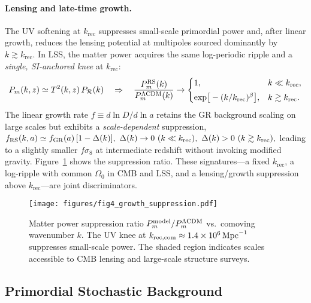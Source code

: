 \documentclass[11pt]{article}
\theoremstyle{definition}
\theoremstyle{remark}
\begin{document}
\paragraph{Lensing and late-time growth.}
The UV softening at \(k_{\mathrm{rec}}\) suppresses small-scale primordial power and, after linear growth, reduces the lensing potential at multipoles sourced dominantly by \(k\gtrsim k_{\mathrm{rec}}\). In LSS, the matter power acquires the same log-periodic ripple and a \emph{single, SI-anchored knee} at \(k_{\mathrm{rec}}\):
\begin{equation}
P_m(k,z)\simeq T^2(k,z)\,P_{\mathcal R}(k)\quad\Rightarrow\quad
\frac{P_m^{\rm RS}(k)}{P_m^{\Lambda{\rm CDM}}(k)}\to
\begin{cases}
1,& k\ll k_{\mathrm{rec}},\\[3pt]
\exp\!\big[-(k/k_{\mathrm{rec}})^\beta\big],& k\gtrsim k_{\mathrm{rec}}.
\end{cases}
\end{equation}
The linear growth rate \(f\equiv d\ln D/d\ln a\) retains the GR background scaling on large scales but exhibits a \emph{scale-dependent} suppression,
\(
f_{\rm RS}(k,a)\simeq f_{\rm GR}(a)\,[1-\Delta(k)],\ 
\Delta(k)\to 0\ (k\ll k_{\mathrm{rec}}),\ \Delta(k)>0\ (k\gtrsim k_{\mathrm{rec}}),
\)
leading to a slightly smaller \(f\sigma_8\) at intermediate redshift without invoking modified gravity. Figure~\ref{fig:growth} shows the suppression ratio. These signatures---a fixed \(k_{\mathrm{rec}}\), a log-ripple with common \(\Omega_0\) in CMB and LSS, and a lensing/growth suppression above \(k_{\mathrm{rec}}\)---are joint discriminators.

\begin{figure}[htbp]
\centering
\texttt{[image: figures/fig4\_growth\_suppression.pdf]}
\caption{Matter power suppression ratio \(P_m^{\rm model}/P_m^{\Lambda{\rm CDM}}\) vs.\ comoving wavenumber \(k\). The UV knee at \(k_{\rm rec,com} \approx 1.4\times10^{6}\,\mathrm{Mpc}^{-1}\) suppresses small-scale power. The shaded region indicates scales accessible to CMB lensing and large-scale structure surveys.}
\label{fig:growth}
\end{figure}

\subsection{Primordial Stochastic Background}
\end{document}
